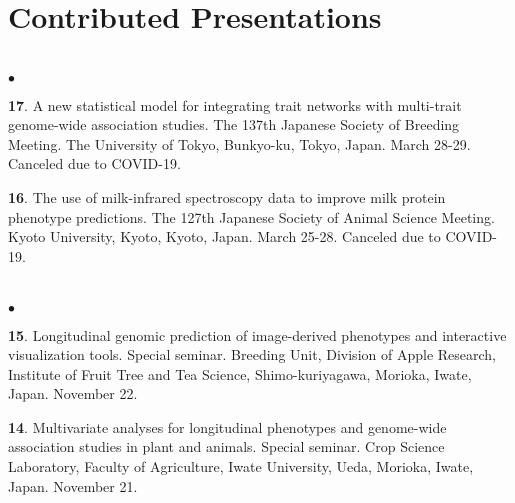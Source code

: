 \documentclass[margin,line,10pt]{res}
\newenvironment{list2}{
  \begin{list}{$\bullet$}{%
      \setlength{\itemsep}{0in}
      \setlength{\parsep}{0in} \setlength{\parskip}{0in}
      \setlength{\topsep}{0in} \setlength{\partopsep}{0in} 
      \setlength{\leftmargin}{0.2in}}}{\end{list}}
\begin{document}
\begin{resume}
\vspace{0.5cm}
\section{\sc Contributed Presentations}
\vspace{1.0cm}

\section{}
\begin{list2}

  \item [{\bf 17}.] A new statistical model for integrating trait networks with multi-trait genome-wide association studies. The 137th Japanese Society of Breeding Meeting. The University of Tokyo, Bunkyo-ku, Tokyo, Japan. March 28-29. Canceled due to COVID-19.
 
  \vspace{0.5cm}
  
  \item [{\bf 16}.] The use of milk-infrared spectroscopy data to improve milk protein phenotype predictions. The 127th Japanese Society of Animal Science Meeting. Kyoto University, Kyoto, Kyoto, Japan. March 25-28. Canceled due to COVID-19.
  
\end{list2}  



\section{}
\begin{list2}

\item [{\bf 15}.] Longitudinal genomic prediction of image-derived phenotypes and interactive visualization tools. Special seminar. Breeding Unit, Division of Apple Research, Institute of Fruit Tree and Tea Science, Shimo-kuriyagawa, Morioka, Iwate, Japan. November 22.
  
  \vspace{0.5cm}
  
\item [{\bf 14}.] Multivariate analyses for longitudinal phenotypes and genome-wide association studies in plant and animals. Special seminar. Crop Science Laboratory, Faculty of Agriculture, Iwate University, Ueda, Morioka, Iwate, Japan. November 21.
  

\end{list2}
\end{resume}
\end{document}
